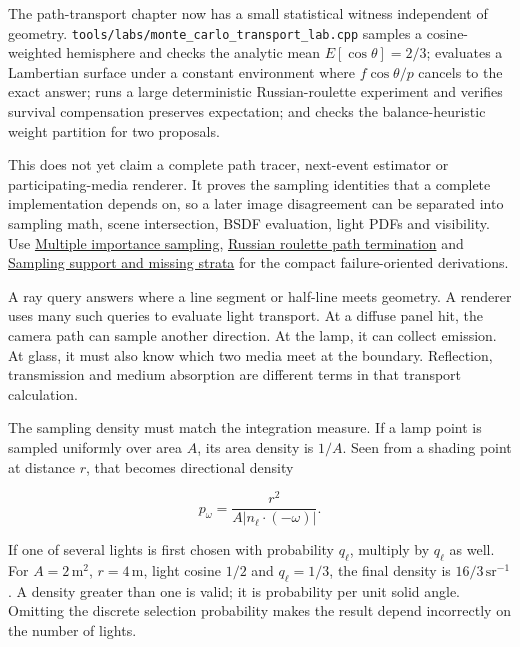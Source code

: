 \hypertarget{03-visual-computing-i-ch007-reconstruction-checkpoint-isolate-estimator-invariants-before-tracing-a-scene}{}

The path-transport chapter now has a small statistical witness independent of geometry. \texttt{tools/labs/monte\_carlo\_transport\_lab.cpp} samples a cosine-weighted hemisphere and checks the analytic mean \(E[\cos\theta]=2/3\); evaluates a Lambertian surface under a constant environment where \(f\cos\theta/p\) cancels to the exact answer; runs a large deterministic Russian-roulette experiment and verifies survival compensation preserves expectation; and checks the balance-heuristic weight partition for two proposals.

This does not yet claim a complete path tracer, next-event estimator or participating-media renderer. It proves the sampling identities that a complete implementation depends on, so a later image disagreement can be separated into sampling math, scene intersection, BSDF evaluation, light PDFs and visibility. Use \hyperref[appendix-ca8898faf1a6]{Multiple importance sampling}, \hyperref[appendix-7277c62d4599]{Russian roulette path termination} and \hyperref[appendix-10308c3d753e]{Sampling support and missing strata} for the compact failure-oriented derivations.

A ray query answers where a line segment or half-line meets geometry. A renderer uses many such queries to evaluate light transport. At a diffuse panel hit, the camera path can sample another direction. At the lamp, it can collect emission. At glass, it must also know which two media meet at the boundary. Reflection, transmission and medium absorption are different terms in that transport calculation.

The sampling density must match the integration measure. If a lamp point is sampled uniformly over area \(A\), its area density is \(1/A\). Seen from a shading point at distance \(r\), that becomes directional density

\[
p_\omega=\frac{r^2}{A\lvert n_\ell\cdot(-\omega)\rvert}.
\]

If one of several lights is first chosen with probability \(q_\ell\), multiply by \(q_\ell\) as well. For \(A=2\,\mathrm{m^2}\), \(r=4\,\mathrm m\), light cosine \(1/2\) and \(q_\ell=1/3\), the final density is \(16/3\,\mathrm{sr}^{-1}\). A density greater than one is valid; it is probability per unit solid angle. Omitting the discrete selection probability makes the result depend incorrectly on the number of lights.


